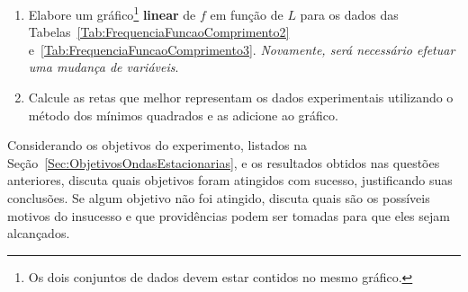 \begin{question}[type={exam}]{1.5}
\begin{enumerate}[label=\roman*.]
\item Elabore um gráfico\footnote{Os dois conjuntos de dados devem estar contidos no mesmo gráfico.} \textbf{linear} de $f$ em função de $L$ para os dados das Tabelas~\ref{Tab:FrequenciaFuncaoComprimento2} e~\ref{Tab:FrequenciaFuncaoComprimento3}. \emph{Novamente, será necessário efetuar uma mudança de variáveis}.
\item Calcule as retas que melhor representam os dados experimentais utilizando o método dos mínimos quadrados e as adicione ao gráfico.
\end{enumerate}
\end{question}



\begin{question}[type={exam}]{2}
Considerando os objetivos do experimento, listados na Seção~\ref{Sec:ObjetivosOndasEstacionarias}, e os resultados obtidos nas questões anteriores, discuta quais objetivos foram atingidos com sucesso, justificando suas conclusões. Se algum objetivo não foi atingido, discuta quais são os possíveis motivos do insucesso e que providências podem ser tomadas para que eles sejam alcançados.
\end{question}

